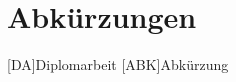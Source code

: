 
\section*{Abkürzungen}
\begin{acronym}[22]
\setlength{\itemsep}{-0.3 \parsep}
[DA]{Diplomarbeit}
[ABK]{Abkürzung}
\end{acronym}
